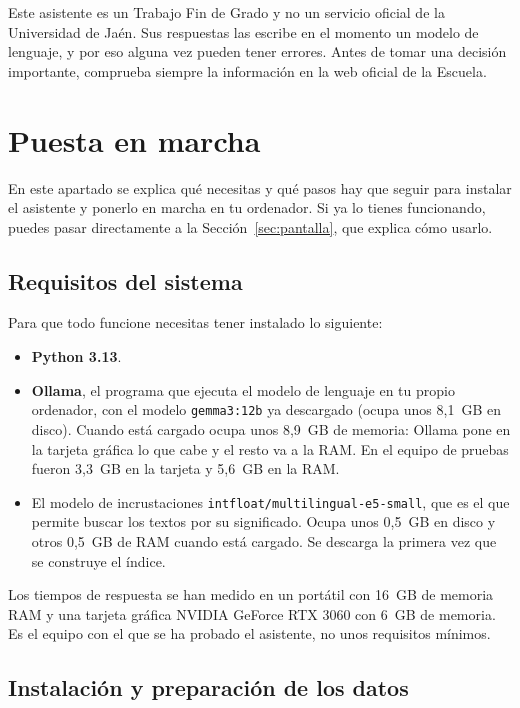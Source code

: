 \documentclass[12pt, a4paper]{article}
\let\textttOriginal\texttt
\renewcommand{\texttt}[1]{\textttOriginal{\textcolor{codigoEnLinea}{#1}}}
\begin{document}
Este asistente es un Trabajo Fin de Grado y no un servicio oficial de la Universidad de Jaén. Sus respuestas las escribe en el momento un modelo de lenguaje, y por eso alguna vez pueden tener errores. Antes de tomar una decisión importante, comprueba siempre la información en la web oficial de la Escuela.

\section{Puesta en marcha}\label{sec:puesta}

En este apartado se explica qué necesitas y qué pasos hay que seguir para instalar el asistente y ponerlo en marcha en tu ordenador. Si ya lo tienes funcionando, puedes pasar directamente a la Sección~\ref{sec:pantalla}, que explica cómo usarlo.

\subsection{Requisitos del sistema}

Para que todo funcione necesitas tener instalado lo siguiente:

\begin{itemize}
  \item \textbf{Python 3.13}.
  \item \textbf{Ollama}, el programa que ejecuta el modelo de lenguaje en tu propio ordenador, con el modelo \texttt{gemma3:12b} ya descargado (ocupa unos 8,1~GB en disco). Cuando está cargado ocupa unos 8,9~GB de memoria: Ollama pone en la tarjeta gráfica lo que cabe y el resto va a la RAM. En el equipo de pruebas fueron 3,3~GB en la tarjeta y 5,6~GB en la RAM.
  \item El modelo de incrustaciones \texttt{intfloat/multilingual-e5-small}, que es el que permite buscar los textos por su significado. Ocupa unos 0,5~GB en disco y otros 0,5~GB de RAM cuando está cargado. Se descarga la primera vez que se construye el índice.
\end{itemize}

Los tiempos de respuesta se han medido en un portátil con 16~GB de memoria RAM y una tarjeta gráfica NVIDIA GeForce RTX 3060 con 6~GB de memoria. Es el equipo con el que se ha probado el asistente, no unos requisitos mínimos.

\subsection[Instalación y preparación de los datos]{Instalación y preparación de los datos}\label{sec:instalacion}
\end{document}
